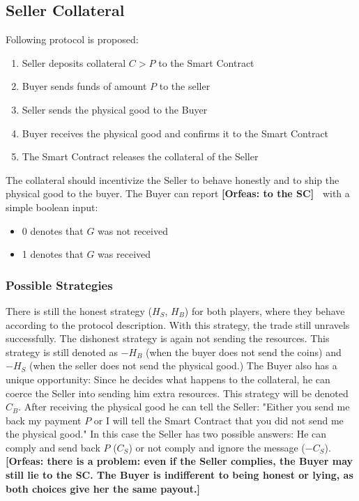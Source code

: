 \documentclass{cacthesis}
\newcommand{\authnote}[3]{{ \footnotesize \textbf{#1[#2: #3]~}}}
\newcommand{\orfnote}[1]{\authnote{\color{blue}}{Orfeas}{#1}}
\begin{document}
\subsection{Seller Collateral}
Following protocol is proposed:
\begin{enumerate}
    \item Seller deposits collateral $C > P$ to the Smart Contract
    \item Buyer sends funds of amount $P$ to the seller 
    \item Seller sends the physical good to the Buyer
    \item Buyer receives the physical good and confirms it to the Smart Contract
    \item The Smart Contract releases the collateral of the Seller
\end{enumerate}
The collateral should incentivize the Seller to behave honestly and to ship the
physical good to the buyer. The Buyer can report \orfnote{to the SC} with a simple boolean input:
\begin{itemize}
    \item 0 denotes that $G$ was not received
    \item 1 denotes that $G$ was received
\end{itemize}
\subsubsection{Possible Strategies}
There is still the honest strategy ($H_S$, $H_B$) for both players, where they behave according to the protocol description. With this strategy, the trade still unravels successfully.\newline
The dishonest strategy is again not sending the resources. This strategy is
still denoted as $-H_B$ (when the buyer does not send the coins) and $-H_S$
(when the seller does not send the physical good.)\newline
The Buyer also has a unique opportunity: Since he decides what happens to the
collateral, he can coerce the Seller into sending him extra resources. This
strategy will be denoted $C_B$.  After receiving the physical good he can tell
the Seller: "Either you send me back my payment $P$ or I will tell the Smart
Contract that you did not send me the physical good." In this case the Seller
has two possible answers: He can comply and send back $P$ ($C_S$) or not comply
and ignore the message ($-C_S$). \orfnote{there is a problem: even if the Seller
complies, the Buyer may still lie to the SC. The Buyer is indifferent to being
honest or lying, as both choices give her the same payout.}\newline
\end{document}
